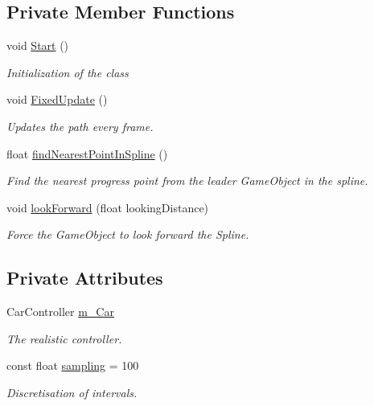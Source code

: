 \subsection*{Private Member Functions}
\begin{DoxyCompactItemize}
\item 
void \hyperlink{classSplineWalker_a7302455633490f68b15aad02b8fa54ca}{Start} ()
\begin{DoxyCompactList}\small\item\em Initialization of the class \end{DoxyCompactList}\item 
void \hyperlink{classSplineWalker_a9f250a7d108edae41325147ff1716db1}{Fixed\+Update} ()
\begin{DoxyCompactList}\small\item\em Updates the path every frame. \end{DoxyCompactList}\item 
float \hyperlink{classSplineWalker_a22d54e33aad18ea37775cea3229b7a72}{find\+Nearest\+Point\+In\+Spline} ()
\begin{DoxyCompactList}\small\item\em Find the nearest progress point from the leader Game\+Object in the spline. \end{DoxyCompactList}\item 
void \hyperlink{classSplineWalker_af1b6b1a3ede935316f1b5f686a2a9989}{look\+Forward} (float looking\+Distance)
\begin{DoxyCompactList}\small\item\em Force the Game\+Object to look forward the Spline. \end{DoxyCompactList}\end{DoxyCompactItemize}
\subsection*{Private Attributes}
\begin{DoxyCompactItemize}
\item 
Car\+Controller \hyperlink{classSplineWalker_ab8305528947e2a3ddfdbdc7b235640ab}{m\+\_\+\+Car}
\begin{DoxyCompactList}\small\item\em The realistic controller.\end{DoxyCompactList}\item 
const float \hyperlink{classSplineWalker_ae63367c40ff2c2c8ca29e43e42951a06}{sampling} = 100
\begin{DoxyCompactList}\small\item\em Discretisation of intervals.\end{DoxyCompactList}\end{DoxyCompactItemize}


